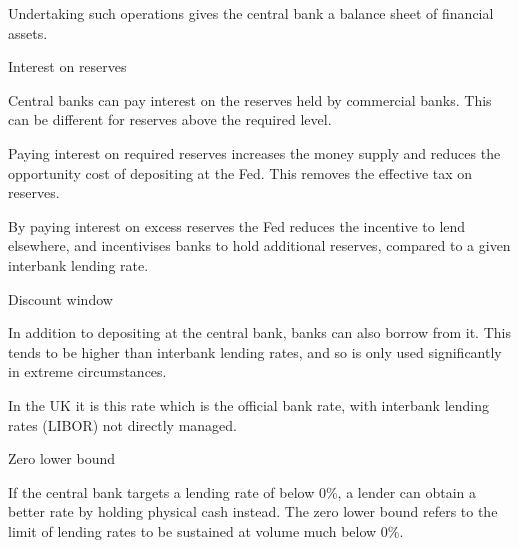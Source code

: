 Undertaking such operations gives the central bank a balance sheet of financial assets.

Interest on reserves

Central banks can pay interest on the reserves held by commercial banks. This can be different for reserves above the required level.

Paying interest on required reserves increases the money supply and reduces the opportunity cost of depositing at the Fed. This removes the effective tax on reserves.

By paying interest on excess reserves the Fed reduces the incentive to lend elsewhere, and incentivises banks to hold additional reserves, compared to a given interbank lending rate.

Discount window

In addition to depositing at the central bank, banks can also borrow from it. This tends to be higher than interbank lending rates, and so is only used significantly in extreme circumstances.

In the UK it is this rate which is the official bank rate, with interbank lending rates (LIBOR) not directly managed.

Zero lower bound

If the central bank targets a lending rate of below 0\%, a lender can obtain a better rate by holding physical cash instead. The zero lower bound refers to the limit of lending rates to be sustained at volume much below 0\%.


